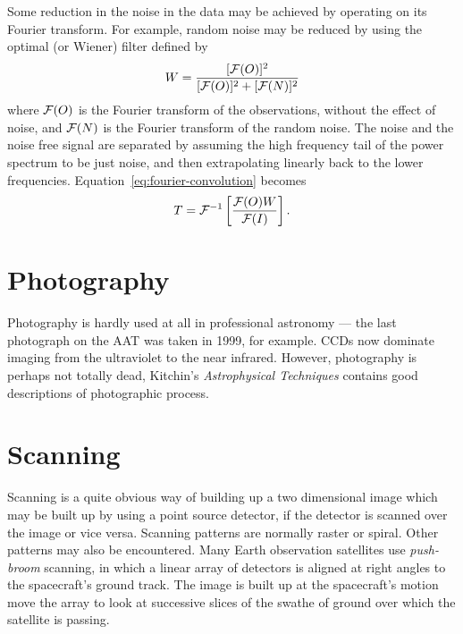 Some reduction in the noise in the data may be achieved by operating on its Fourier transform. For example, random noise may be reduced by using the optimal (or Wiener) filter defined by 
\[
W={[{\cal F}(O)]^2\over[{\cal F}(O)]^2+[{\cal F}(N)]^2}
\]
where ${\cal F}(O)$ is the Fourier transform of the observations, without the effect of noise, and ${\cal F}(N)$ is the Fourier transform of the random noise. The noise and the noise free signal are separated by assuming the high frequency tail of the power spectrum to be just noise, and then extrapolating linearly back to the lower frequencies. Equation~\ref{eq:fourier-convolution} becomes
\[
T={\cal F}^{-1}\left[{{\cal F}(O)W\over{\cal F}(I)}\right].
\]

\section{Photography}
Photography is hardly used at all in professional astronomy --- the last photograph on the AAT was taken in 1999, for example. CCDs now dominate imaging from the ultraviolet to the near infrared. However, photography is perhaps not totally dead, Kitchin's {\it Astrophysical Techniques} contains good descriptions of photographic process.

\section{Scanning}

Scanning is a quite obvious way of building up a two dimensional image which may be built up by using a point source detector, if the detector is scanned over the image or vice versa. Scanning patterns are normally raster or spiral. Other patterns may also be encountered. Many Earth observation satellites use {\it push-broom} scanning, in which a linear array of detectors is aligned at right angles to the spacecraft's ground track. The image is built up at the spacecraft's motion move the array to look at successive slices of the swathe of ground over which the satellite is passing.

